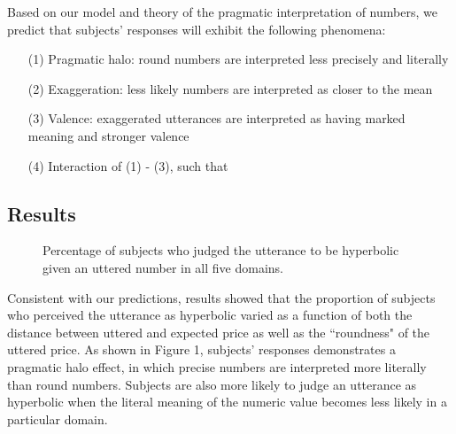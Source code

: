 \documentclass{article} %
\begin{document}
Based on our model and theory of the pragmatic interpretation of numbers, we predict that subjects' responses will exhibit the following phenomena:
\begin{itemize}
\item[(1)] Pragmatic halo: round numbers are interpreted less precisely and literally
\item[(2)] Exaggeration: less likely numbers are interpreted as closer to the mean
\item[(3)] Valence: exaggerated utterances are interpreted as having marked meaning and stronger valence
\item[(4)] Interaction of (1) - (3), such that %
\end{itemize}

\subsection{Results}


\begin{figure}[t]
\caption{Percentage of subjects who judged the utterance to be hyperbolic given an uttered number in all five domains.}
\end{figure}

Consistent with our predictions, results showed that the proportion of subjects who perceived the utterance as hyperbolic varied as a function of both the distance between uttered and expected price as well as the ``roundness" of the uttered price. As shown in Figure 1, subjects' responses demonstrates a pragmatic halo effect, in which precise numbers are interpreted more literally than round numbers. Subjects are also more likely to judge an utterance as hyperbolic when the literal meaning of the numeric value becomes less likely in a particular domain. 
\end{document}
